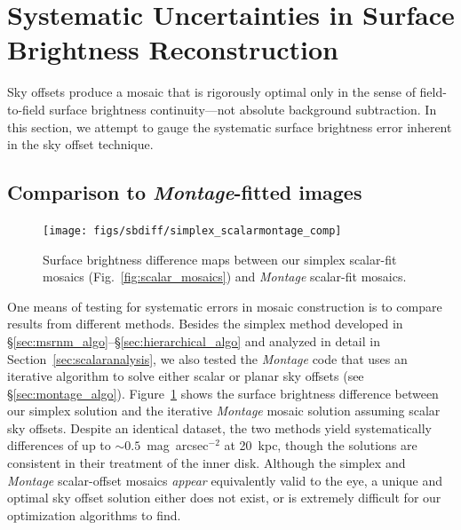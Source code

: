\documentclass[iop]{emulateapj}
\newcommand{\sw}[1]{\textit{#1}} %
\newcommand{\Fig}[1]{Fig.~\ref{fig:#1}}  %
\newcommand{\Sec}[1]{\S\ref{sec:#1}}  %
\begin{document}
\section{Systematic Uncertainties in Surface Brightness Reconstruction}
\label{sec:systematics}

Sky offsets produce a mosaic that is rigorously optimal only in the sense of field-to-field surface brightness continuity---not absolute background subtraction. In this section, we attempt to gauge the systematic surface brightness error inherent in the sky offset technique.


\subsection{Comparison to \sw{Montage}-fitted images}

\begin{figure}[t]
    \centering
        \texttt{[image: figs/sbdiff/simplex\_scalarmontage\_comp]}
        \caption{Surface brightness difference maps between our simplex scalar-fit mosaics (\Fig{scalar_mosaics}) and \sw{Montage} scalar-fit mosaics.}
    \label{fig:simplex_scalarmontage_comp}
\end{figure}

One means of testing for systematic errors in mosaic construction is to compare results from different methods.
Besides the simplex method developed in \Sec{msrnm_algo}--\Sec{hierarchical_algo} and analyzed in detail in Section~\ref{sec:scalaranalysis}, we also tested the \sw{Montage} code that uses an iterative algorithm to solve either scalar or planar sky offsets (see \Sec{montage_algo}).
Figure~\ref{fig:simplex_scalarmontage_comp} shows the surface brightness difference between our simplex solution and the iterative \sw{Montage} mosaic solution assuming scalar sky offsets.
Despite an identical dataset, the two methods yield systematically differences of up to $\sim 0.5$~mag~arcsec$^{-2}$ at 20~kpc, though the solutions are consistent in their treatment of the inner disk.
Although the simplex and \sw{Montage} scalar-offset mosaics \emph{appear} equivalently valid to the eye, a unique and optimal sky offset solution either does not exist, or is extremely difficult for our optimization algorithms to find.
\end{document}
